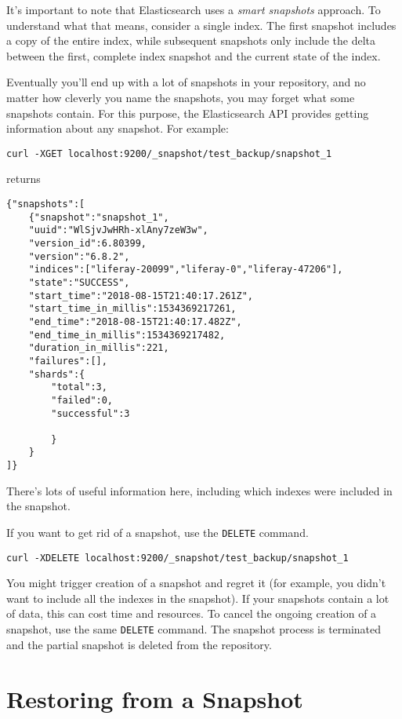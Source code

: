 It's important to note that Elasticsearch uses a \emph{smart snapshots}
approach. To understand what that means, consider a single index. The
first snapshot includes a copy of the entire index, while subsequent
snapshots only include the delta between the first, complete index
snapshot and the current state of the index.

Eventually you'll end up with a lot of snapshots in your repository, and
no matter how cleverly you name the snapshots, you may forget what some
snapshots contain. For this purpose, the Elasticsearch API provides
getting information about any snapshot. For example:

\begin{verbatim}
curl -XGET localhost:9200/_snapshot/test_backup/snapshot_1
\end{verbatim}

returns

\begin{verbatim}
{"snapshots":[
    {"snapshot":"snapshot_1",
    "uuid":"WlSjvJwHRh-xlAny7zeW3w",
    "version_id":6.80399,
    "version":"6.8.2",
    "indices":["liferay-20099","liferay-0","liferay-47206"],
    "state":"SUCCESS",
    "start_time":"2018-08-15T21:40:17.261Z",
    "start_time_in_millis":1534369217261,
    "end_time":"2018-08-15T21:40:17.482Z",
    "end_time_in_millis":1534369217482,
    "duration_in_millis":221,
    "failures":[],
    "shards":{
        "total":3,
        "failed":0,
        "successful":3
        
        }
    }
]}
\end{verbatim}

There's lots of useful information here, including which indexes were
included in the snapshot.

If you want to get rid of a snapshot, use the \texttt{DELETE} command.

\begin{verbatim}
curl -XDELETE localhost:9200/_snapshot/test_backup/snapshot_1
\end{verbatim}

You might trigger creation of a snapshot and regret it (for example, you
didn't want to include all the indexes in the snapshot). If your
snapshots contain a lot of data, this can cost time and resources. To
cancel the ongoing creation of a snapshot, use the same \texttt{DELETE}
command. The snapshot process is terminated and the partial snapshot is
deleted from the repository.

\section{Restoring from a Snapshot}\label{restoring-from-a-snapshot}

